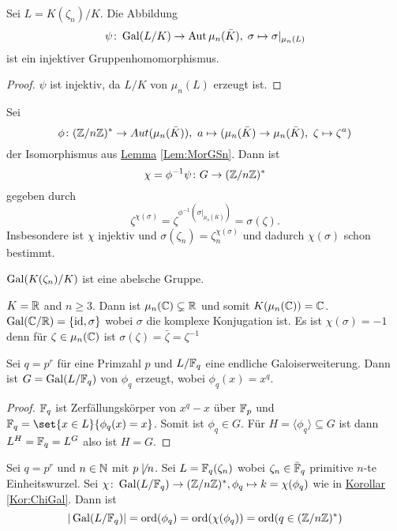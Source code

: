 \begin{Satz}
    Sei $L=K(\zeta_n)/K$. Die Abbildung 
    $$\psi\colon\operatorname{Gal}(L/K)\to\operatorname{Aut}\mu_n(\bar K),\; \sigma\mapsto \sigma|_{\mu_n(L)}$$ ist ein injektiver Gruppenhomomorphismus.
\end{Satz}
\begin{proof}
    $\psi$ ist injektiv, da $L/K$ von $\mu_n(L)$ erzeugt ist.
\end{proof}
\begin{Kor}\label{Kor:ChiGal}
    Sei $$\phi\colon(\ZZ/n\ZZ)^*\to Aut(\mu_n(\bar K)),\ a\mapsto (\mu_n(\bar K)\to\mu_n(\bar K),\ \zeta\mapsto \zeta^a)$$ der Isomorphismus aus \hyperref[Lem:MorGSn]{Lemma} \ref{Lem:MorGSn}.
    Dann ist $$\chi=\phi^{-1}\psi\colon G\to (\mathbb{Z}/n\mathbb{Z})^* $$ gegeben durch $$\zeta^{\chi(\sigma)}=\zeta^{\phi^{-1}(\sigma|_{\mu_n(\bar K)})}=\sigma(\zeta).$$
    Insbesondere ist $\chi$ injektiv und $\sigma(\zeta_n)=\zeta_n^{\chi(\sigma)}$ und dadurch $\chi(\sigma)$ schon bestimmt.
\end{Kor}
\begin{Kor}
    $\operatorname{Gal}(K(\zeta_n)/K)$ ist eine abelsche Gruppe.
\end{Kor}
\begin{Bsp}
    $K=\mathbb{R}$ and $n\geq 3$. Dann ist $\mu_n(\mathbb{C})\subsetneq\mathbb{R}$ und somit $K(\mu_n(\mathbb{C}))=\mathbb{C}$.
    $\operatorname{Gal}(\mathbb{C}/\mathbb{R})=\{\mathrm{id},\sigma\}$ wobei $\sigma$ die komplexe Konjugation ist. Es ist $\chi(\sigma)=-1$ denn
    für $\zeta\in\mu_n(\mathbb{C})$ ist $\sigma(\zeta)=\bar\zeta=\zeta^{-1}$
\end{Bsp}
\begin{Satz}
    Sei $q=p^r$ für eine Primzahl $p$ und $L/\mathbb{F}_q$ eine endliche Galoiserweiterung. Dann ist $G=\operatorname{Gal}(L/\mathbb{F}_q)$ von $\phi_q$ erzeugt, wobei $\phi_q(x)=x^q$.
\end{Satz}
\begin{proof}
    $\mathbb{F}_q$ ist Zerfällungskörper von $x^q-x$ über $\mathbb{F}_p$ und
    $\FF_q=\set{x\in L}{ \phi_q(x)=x}$. Somit ist $\phi_q\in G$.
    Für $H=\langle \phi_q\rangle\subseteq G$ ist 
    dann $L^H=\mathbb{F}_q=L^G$ also ist $H=G$.
\end{proof}
\begin{Kor}
    Sei $q=p^r$ und $n\in\mathbb{N}$ mit $p\not\mid n$. Sei $L=\mathbb{F}_q(\zeta_n)$ wobei $\zeta_n\in\bar {\mathbb{F}}_q$ primitive $n$-te Einheitswurzel.
    Sei $\chi\colon \operatorname{Gal}(L/\mathbb{F}_q)\to (\mathbb{Z}/n\mathbb{Z})^*, \phi_q\mapsto k=\chi(\phi_q)$ wie in \hyperref[Kor:ChiGal]{Korollar} \ref{Kor:ChiGal}. Dann ist
    $$|\operatorname{Gal}(L/\mathbb{F}_q)|=\operatorname{ord}(\phi_q)=\operatorname{ord}(\chi(\phi_q))=\operatorname{ord}(q\in(\mathbb{Z}/n\mathbb{Z})^*)$$
\end{Kor}
